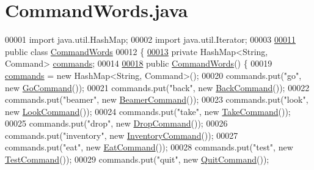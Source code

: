 \hypertarget{CommandWords_8java_source}{\section{Command\-Words.\-java}
}

\begin{DoxyCode}
00001 \textcolor{keyword}{import} java.util.HashMap;
00002 \textcolor{keyword}{import} java.util.Iterator;
00003 
\hypertarget{CommandWords_8java_source_l00011}{}\hyperlink{classCommandWords}{00011} \textcolor{keyword}{public} \textcolor{keyword}{class }\hyperlink{classCommandWords}{CommandWords}
00012 \{
\hypertarget{CommandWords_8java_source_l00013}{}\hyperlink{classCommandWords_a87d12c01410f3c523f7889d523d537e7}{00013}     \textcolor{keyword}{private} HashMap<String, Command> \hyperlink{classCommandWords_a87d12c01410f3c523f7889d523d537e7}{commands};
00014 
\hypertarget{CommandWords_8java_source_l00018}{}\hyperlink{classCommandWords_a2d8c096723adb3f822cc001bccd92ed7}{00018}     \textcolor{keyword}{public} \hyperlink{classCommandWords_a2d8c096723adb3f822cc001bccd92ed7}{CommandWords}() \{
00019         \hyperlink{classCommandWords_a87d12c01410f3c523f7889d523d537e7}{commands} = \textcolor{keyword}{new} HashMap<String, Command>();
00020         commands.put(\textcolor{stringliteral}{"go"}, \textcolor{keyword}{new} \hyperlink{classGoCommand}{GoCommand}());
00021         commands.put(\textcolor{stringliteral}{"back"}, \textcolor{keyword}{new} \hyperlink{classBackCommand}{BackCommand}());
00022         commands.put(\textcolor{stringliteral}{"beamer"}, \textcolor{keyword}{new} \hyperlink{classBeamerCommand}{BeamerCommand}());
00023         commands.put(\textcolor{stringliteral}{"look"}, \textcolor{keyword}{new} \hyperlink{classLookCommand}{LookCommand}());
00024         commands.put(\textcolor{stringliteral}{"take"}, \textcolor{keyword}{new} \hyperlink{classTakeCommand}{TakeCommand}());
00025         commands.put(\textcolor{stringliteral}{"drop"}, \textcolor{keyword}{new} \hyperlink{classDropCommand}{DropCommand}());
00026         commands.put(\textcolor{stringliteral}{"inventory"}, \textcolor{keyword}{new} \hyperlink{classInventoryCommand}{InventoryCommand}());
00027         commands.put(\textcolor{stringliteral}{"eat"}, \textcolor{keyword}{new} \hyperlink{classEatCommand}{EatCommand}());
00028         commands.put(\textcolor{stringliteral}{"test"}, \textcolor{keyword}{new} \hyperlink{classTestCommand}{TestCommand}());
00029         commands.put(\textcolor{stringliteral}{"quit"}, \textcolor{keyword}{new} \hyperlink{classQuitCommand}{QuitCommand}());

\end{DoxyCode}
